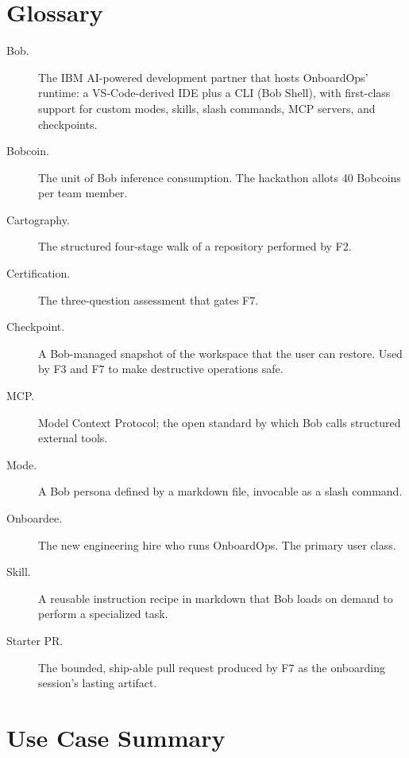 \documentclass[11pt,letterpaper]{article}
\begin{document}
\appendix
\section{Glossary}

\begin{description}
  \item[Bob.] The IBM AI-powered development partner that hosts OnboardOps' runtime: a VS-Code-derived IDE plus a CLI (Bob Shell), with first-class support for custom modes, skills, slash commands, MCP servers, and checkpoints.
  \item[Bobcoin.] The unit of Bob inference consumption. The hackathon allots 40 Bobcoins per team member.
  \item[Cartography.] The structured four-stage walk of a repository performed by F2.
  \item[Certification.] The three-question assessment that gates F7.
  \item[Checkpoint.] A Bob-managed snapshot of the workspace that the user can restore. Used by F3 and F7 to make destructive operations safe.
  \item[MCP.] Model Context Protocol; the open standard by which Bob calls structured external tools.
  \item[Mode.] A Bob persona defined by a markdown file, invocable as a slash command.
  \item[Onboardee.] The new engineering hire who runs OnboardOps. The primary user class.
  \item[Skill.] A reusable instruction recipe in markdown that Bob loads on demand to perform a specialized task.
  \item[Starter PR.] The bounded, ship-able pull request produced by F7 as the onboarding session's lasting artifact.
\end{description}

\section{Use Case Summary}
\end{document}
